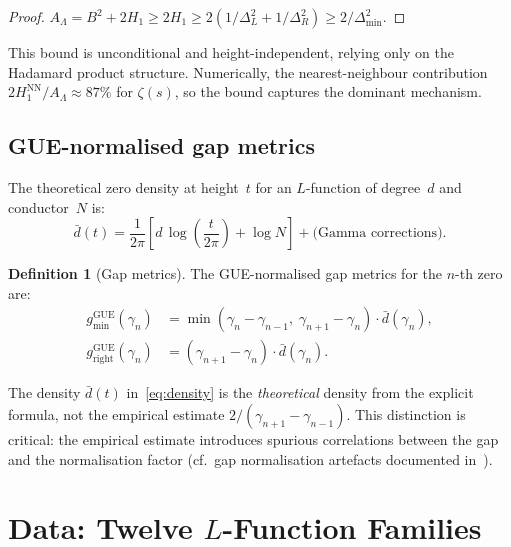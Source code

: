 \documentclass[11pt, a4paper]{article}
\theoremstyle{plain}
\theoremstyle{definition}
\newtheorem{definition}{Definition}[section]
\newcommand{\Lam}{\Lambda}
\DeclareMathOperator{\GUE}{GUE}
\begin{document}
\begin{proof}
$A_\Lam = B^2 + 2H_1 \ge 2H_1 \ge 2(1/\Delta_L^2 + 1/\Delta_R^2)
\ge 2/\Delta_{\min}^2$.
\end{proof}

This bound is unconditional and height-independent,
relying only on the Hadamard product structure.
Numerically, the nearest-neighbour contribution
$2H_1^{\mathrm{NN}}/A_\Lam \approx 87\%$ for $\zeta(s)$,
so the bound captures the dominant mechanism.


\subsection{GUE-normalised gap metrics}
\label{ssec:gap_def}

The theoretical zero density at height~$t$ for an $L$-function
of degree~$d$ and conductor~$N$ is:
\begin{equation}\label{eq:density}
  \bar{d}(t) = \frac{1}{2\pi}\left[
    d\,\log\!\left(\frac{t}{2\pi}\right) + \log N
  \right]
  + \text{(Gamma corrections)}.
\end{equation}

\begin{definition}[Gap metrics]\label{def:gaps}
The GUE-normalised gap metrics for the $n$-th zero are:
\begin{align}
  g_{\min}^{\GUE}(\gamma_n) &=
    \min(\gamma_n - \gamma_{n-1},\;\gamma_{n+1} - \gamma_n)
    \cdot \bar{d}(\gamma_n),
  \label{eq:gap_min} \\
  g_{\mathrm{right}}^{\GUE}(\gamma_n) &=
    (\gamma_{n+1} - \gamma_n) \cdot \bar{d}(\gamma_n).
  \label{eq:gap_right}
\end{align}
\end{definition}

The density $\bar{d}(t)$ in~\eqref{eq:density} is the
\emph{theoretical} density from the explicit formula,
not the empirical estimate $2/(\gamma_{n+1} - \gamma_{n-1})$.
This distinction is critical: the empirical estimate introduces
spurious correlations between the gap and the normalisation
factor (cf.\ gap normalisation artefacts documented
in~\cite{paper2}).


\section{Data: Twelve $L$-Function Families}
\label{sec:data}
\end{document}
